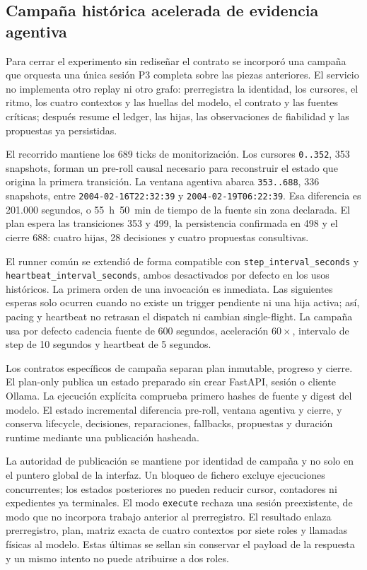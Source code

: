 \subsection{Campaña histórica acelerada de evidencia agentiva}

Para cerrar el experimento sin rediseñar el contrato se incorporó una campaña
que orquesta una única sesión P3 completa sobre las piezas anteriores. El
servicio no implementa otro replay ni otro grafo: prerregistra la identidad, los
cursores, el ritmo, los cuatro contextos y las huellas del modelo, el contrato y
las fuentes críticas; después resume el ledger, las hijas, las observaciones de
fiabilidad y las propuestas ya persistidas.

El recorrido mantiene los 689 ticks de monitorización. Los cursores
\texttt{0..352}, 353 snapshots, forman un pre-roll causal necesario para
reconstruir el estado que origina la primera transición. La ventana agentiva
abarca \texttt{353..688}, 336 snapshots, entre
\texttt{2004-02-16T22:32:39} y \texttt{2004-02-19T06:22:39}. Esa diferencia es
201.000 segundos, o 55~h~50~min de tiempo de la fuente sin zona declarada. El
plan espera las transiciones 353 y 499, la persistencia confirmada en 498 y el
cierre 688: cuatro hijas, 28 decisiones y cuatro propuestas consultivas.

El runner común se extendió de forma compatible con
\texttt{step\_interval\_seconds} y
\texttt{heartbeat\_interval\_seconds}, ambos desactivados por defecto en los
usos históricos. La primera orden de una invocación es inmediata. Las siguientes
esperas solo ocurren cuando no existe un trigger pendiente ni una hija activa;
así, pacing y heartbeat no retrasan el dispatch ni cambian single-flight. La
campaña usa por defecto cadencia fuente de 600 segundos, aceleración
$60\times$, intervalo de step de 10 segundos y heartbeat de 5 segundos.

Los contratos específicos de campaña separan plan inmutable, progreso y cierre.
El plan-only publica un estado preparado sin crear FastAPI, sesión o cliente
Ollama. La ejecución explícita comprueba primero hashes de fuente y digest del
modelo. El estado incremental diferencia pre-roll, ventana agentiva y cierre, y
conserva lifecycle, decisiones, reparaciones, fallbacks, propuestas y duración
runtime mediante una publicación hasheada.

La autoridad de publicación se mantiene por identidad de campaña y no solo en
el puntero global de la interfaz. Un bloqueo de fichero excluye ejecuciones
concurrentes; los estados posteriores no pueden reducir cursor, contadores ni
expedientes ya terminales. El modo \texttt{execute} rechaza una sesión
preexistente, de modo que no incorpora trabajo anterior al prerregistro. El
resultado enlaza prerregistro, plan, matriz exacta de cuatro contextos por siete
roles y llamadas físicas al modelo. Estas últimas se sellan sin conservar el
payload de la respuesta y un mismo intento no puede atribuirse a dos roles.

